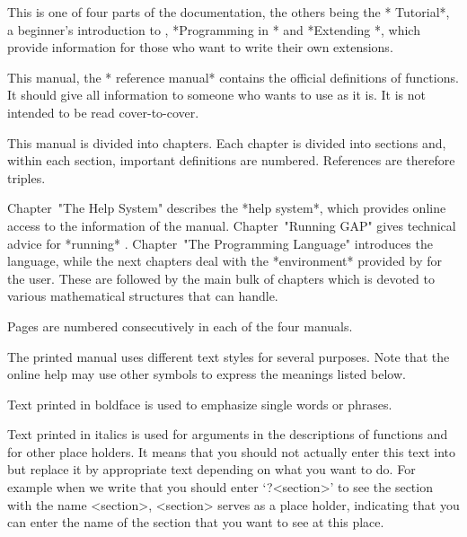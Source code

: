 %
%
%
%

This is one of four parts of the {\GAP} documentation,
the others being the *{\GAP} Tutorial*, a beginner's introduction to {\GAP},
*Programming in {\GAP}* and *Extending {\GAP}*,
which provide information for those who want to write their own
{\GAP} extensions.

This manual, the *{\GAP} reference manual* contains the official definitions
of {\GAP} functions. It should give all information to someone who wants to
use {\GAP} as it is. It is not intended to be read cover-to-cover.

This manual is divided into chapters.
Each chapter is divided into sections
and, within each section, important definitions are numbered.
References are therefore triples.

Chapter~"The Help System" describes the *help system*,
which provides online access to the information of the manual.
Chapter~"Running GAP" gives technical advice for *running* {\GAP}.
Chapter~"The Programming Language" introduces the {\GAP} language,
while the next chapters deal with the *environment*
provided by {\GAP} for the user.
These are followed by the main bulk of chapters
which is devoted to various mathematical structures that {\GAP} can handle.

Pages are numbered consecutively in each of the four manuals.


The printed manual uses different text styles for several purposes.
Note that the online help may use other symbols to express the meanings
listed below.%


Text printed in boldface is used to emphasize single words or phrases.


Text printed in italics is used for arguments in the descriptions
of functions and for other place holders. It means that you should not
actually enter this text into {\GAP} but replace it by  appropriate
text depending on what you want to do. For example when we write that
you should enter `?<section>' to see the section with the name <section>,
<section> serves as a place holder, indicating that you can enter the
name of the section that you want to see at this place.

